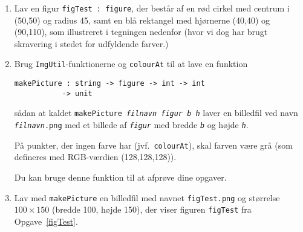 \documentclass[a4paper,12pt]{article}
\begin{document}
\begin{enumerate}[label=8ø.\arabic*]

\item \label{figTest} Lav en figur \texttt{figTest : figure}, der består af en rød cirkel
  med centrum i (50,50) og radius 45, samt en blå rektangel med
  hjørnerne (40,40) og (90,110), som illustreret i tegningen nedenfor (hvor vi dog har brugt skravering i stedet for udfyldende farver.)
  \begin{center}
    \begin{minipage}{.23\textwidth}
    \end{minipage}
  \end{center}

\item Brug \texttt{ImgUtil}-funktionerne og \texttt{colourAt} til at lave en
  funktion

  \vspace{-4mm}
\begin{verbatim}
makePicture : string -> figure -> int -> int
           -> unit
\end{verbatim}
  \vspace{-4mm}
  
  \noindent
  sådan at kaldet \texttt{makePicture \emph{filnavn figur b h}} laver en
  billedfil ved navn \texttt{\emph{filnavn}.png} med et billede af
  \texttt{\emph{figur}} med bredde \texttt{\emph{b}} og højde
  \texttt{\emph{h}}.
  
  På punkter, der ingen farve har (jvf.\ \texttt{colourAt}), skal farven
  være grå (som defineres med RGB-værdien (128,128,128)).
  
  Du kan bruge denne funktion til at afprøve dine opgaver.

\item Lav med \texttt{makePicture} en billedfil med navnet
  \texttt{figTest.png} og størrelse $100\times150$ (bredde 100, højde 150),
  der viser figuren \texttt{figTest} fra Opgave~\ref{figTest}.


\end{enumerate}
\end{document}
